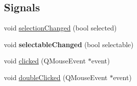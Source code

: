 \subsection*{Signals}
\begin{DoxyCompactItemize}
\item 
void \hyperlink{classQCPTextElement_a49f45b87ee9c1fe866c2cdd12af17a9a}{selection\+Changed} (bool selected)
\item 
void {\bfseries selectable\+Changed} (bool selectable)\hypertarget{classQCPTextElement_ac4567260b52d02bfbad63357d13986c5}{}\label{classQCPTextElement_ac4567260b52d02bfbad63357d13986c5}

\item 
void \hyperlink{classQCPTextElement_ad2246a0e701c0655623f048737298334}{clicked} (Q\+Mouse\+Event $\ast$event)
\item 
void \hyperlink{classQCPTextElement_a9c6fd27ae8a7c3a02df7a6bbd3509e40}{double\+Clicked} (Q\+Mouse\+Event $\ast$event)
\end{DoxyCompactItemize}
